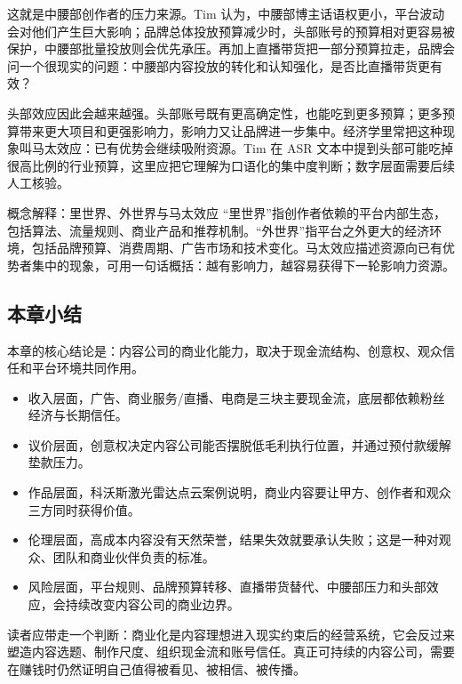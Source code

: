 这就是中腰部创作者的压力来源。Tim 认为，中腰部博主话语权更小，平台波动会对他们产生巨大影响；品牌总体投放预算减少时，头部账号的预算相对更容易被保护，中腰部批量投放则会优先承压。再加上直播带货把一部分预算拉走，品牌会问一个很现实的问题：中腰部内容投放的转化和认知强化，是否比直播带货更有效？

头部效应因此会越来越强。头部账号既有更高确定性，也能吃到更多预算；更多预算带来更大项目和更强影响力，影响力又让品牌进一步集中。经济学里常把这种现象叫马太效应：已有优势会继续吸附资源。Tim 在 ASR 文本中提到头部可能吃掉很高比例的行业预算，这里应把它理解为口语化的集中度判断；数字层面需要后续人工核验。

\begin{knowledgebox}{概念解释：里世界、外世界与马太效应}
“里世界”指创作者依赖的平台内部生态，包括算法、流量规则、商业产品和推荐机制。“外世界”指平台之外更大的经济环境，包括品牌预算、消费周期、广告市场和技术变化。马太效应描述资源向已有优势者集中的现象，可用一句话概括：越有影响力，越容易获得下一轮影响力资源。
\end{knowledgebox}

\subsection{本章小结}

本章的核心结论是：内容公司的商业化能力，取决于现金流结构、创意权、观众信任和平台环境共同作用。

\begin{itemize}
  \item 收入层面，广告、商业服务/直播、电商是三块主要现金流，底层都依赖粉丝经济与长期信任。
  \item 议价层面，创意权决定内容公司能否摆脱低毛利执行位置，并通过预付款缓解垫款压力。
  \item 作品层面，科沃斯激光雷达点云案例说明，商业内容要让甲方、创作者和观众三方同时获得价值。
  \item 伦理层面，高成本内容没有天然荣誉，结果失效就要承认失败；这是一种对观众、团队和商业伙伴负责的标准。
  \item 风险层面，平台规则、品牌预算转移、直播带货替代、中腰部压力和头部效应，会持续改变内容公司的商业边界。
\end{itemize}

读者应带走一个判断：商业化是内容理想进入现实约束后的经营系统，它会反过来塑造内容选题、制作尺度、组织现金流和账号信任。真正可持续的内容公司，需要在赚钱时仍然证明自己值得被看见、被相信、被传播。
